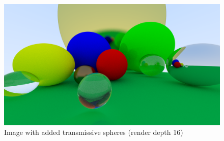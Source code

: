 \documentclass[12pt]{report}
\begin{document}
\begin{figure}[h!]
\includegraphics[width=\textwidth]{step7}
\centering
\caption{Image with added transmissive spheres (render depth 16)}
\label{fig:step7}
\end{figure}
\end{document}
